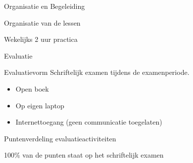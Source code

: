 \documentclass{studiewijzer}
\begin{document}
\showheader

\begin{categorybox}{Organisatie en Begeleiding}
    \begin{category}{Organisatie van de lessen}
        \begin{items}
            \item Wekelijks 2 uur practica
        \end{items}
    \end{category}
\end{categorybox}

\begin{categorybox}{Evaluatie}
    \begin{category}{Evaluatievorm}
        Schriftelijk examen tijdens de examenperiode.
        \begin{itemize}
            \item Open boek
            \item Op eigen laptop
            \item Internettoegang (geen communicatie toegelaten)
        \end{itemize}
    \end{category}

    \begin{category}{Puntenverdeling evaluatieactiviteiten}
        \begin{items}
            \item 100\% van de punten staat op het schriftelijk examen
        \end{items}
    \end{category}
\end{categorybox}
\end{document}
